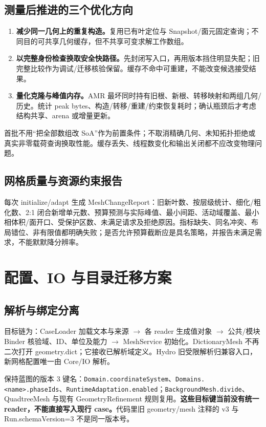 \documentclass[UTF8,a4paper,11pt,fontset=fandol]{ctexart}
\newcommand{\code}[1]{\nolinkurl{#1}}
\begin{document}
\subsection{测量后推进的三个优化方向}
\begin{enumerate}
\item \textbf{减少同一几何上的重复构造。}复用已有叶定位与 Snapshot/面元固定查询；不同目的可共享几何缓存，但不共享可变求解工作数组。
\item \textbf{以完整身份检查换取安全快路径。}先封闭写入口，再用版本挡住明显失配；旧完整比较作为调试/迁移核验保留。缓存不命中可重建，不能改变候选接受结果。
\item \textbf{量化克隆与峰值内存。}AMR 最坏同时持有旧根、新根、转移映射和两组几何/历史。统计 peak bytes、构造/转移/重建/约束恢复耗时；确认瓶颈后才考虑结构共享、arena 或增量更新。
\end{enumerate}
首批不用“把全部数组改 SoA”作为前置条件；不取消精确几何、未知拓扑拒绝或真实非零载荷查询换取性能。缓存丢失、线程数变化和输出关闭都不应改变物理问题。

\subsection{网格质量与资源约束报告}
每次 initialize/adapt 生成 MeshChangeReport：旧新叶数、按层级统计、细化/粗化数、2:1 闭合新增单元数、预算预测与实际峰值、最小间距、活动域覆盖、最小相体积/面开口、受保护区数、未满足请求及拒绝原因。指标缺失、同名冲突、布局错位、非有限值都明确失败；是否允许预算截断应是具名策略，并报告未满足需求，不能默默降分辨率。

\section{配置、IO 与目录迁移方案}
\subsection{解析与绑定分离}
目标链为：CaseLoader 加载文本与来源 $\to$ 各 reader 生成值对象 $\to$ 公共/模块 Binder 核验域、ID、单位及能力 $\to$ MeshService 初始化。DictionaryMesh 不再二次打开 geometry.dict；它接收已解析域定义。Hydro 旧受限解析归兼容入口，新网格配置唯一由 Core/IO 解析。

保持蓝图的版本 3 键名：\code{Domain.coordinateSystem}、\code{Domains.<name>.phaseIds}、\code{RuntimeAdaptation.enabled}；\code{BackgroundMesh.divide}、QuadtreeMesh 与现有 GeometryRefinement 规则复用。\textbf{这些目标键当前没有统一 reader，不能直接写入现行 case。}代码里旧 geometry/mesh 注释的 v3 与 Run.schemaVersion=3 不是同一版本号。
\end{document}
